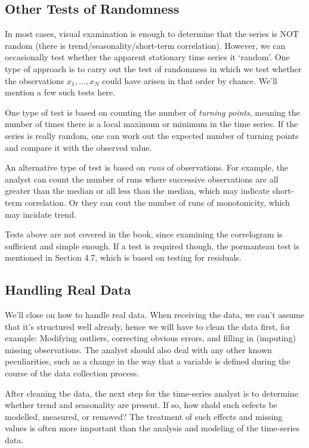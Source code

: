 \subsection{Other Tests of Randomness}
In most cases, visual examination is enough to determine that the series is NOT random (there is trend/seasonality/short-term correlation). However, we can occasionally test whether the apparent stationary time series it `random'. One type of approach is to carry out the test of randomness in which we test whether the observations $x_1, \dots, x_N$ could have arisen in that order by chance. We'll mention a few such tests here. 

One type of test is based on counting the number of \textit{turning points}, meaning the number of times there is a local maximum or minimum in the time series. If the series is really random, one can work out the expected number of turning points and compare it with the observed value.

An alternative type of test is based on \textit{runs} of observations. For example, the analyst can count the number of runs where successive observations are all greater than the median or all less than the median, which may indicate short-term correlation. Or they can cout the number of runs of monotonicity, which may incidate trend.

Tests above are not covered in the book, since examining the correlogram is sufficient and simple enough. If a test is required though, the pormanteau test is mentioned in Section 4.7, which is based on testing for residuals.



\subsection{Handling Real Data}
We'll close on how to handle real data. When receiving the data, we can't assume that it's structured well already, hence we will have to clean the data first, for example: Modifying outliers, correcting obvious errors, and filling in (imputing) missing observations. The analyst should also deal with any other known peculiarities, such as a change in the way that a variable is defined during the course of the data collection process.

After cleaning the data, the next step for the time-series analyst is to determine whether trend and seasonality are present. If so, how shold such eefects be modelled, measured, or removed? The treatment of such effects and missing values is often more important than the analysis and modeling of the time-series data.


